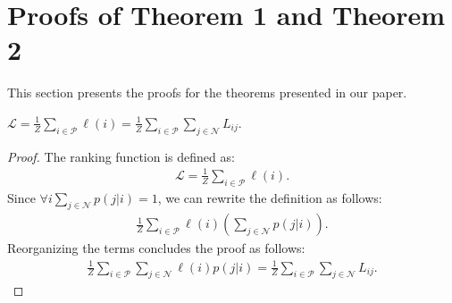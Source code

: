 \documentclass{article}
\newenvironment{customthm}[1]
  {\renewcommand\theinnercustomthm{#1}\innercustomthm}
  {\endinnercustomthm}
\begin{document}
 \section{Proofs of Theorem 1 and Theorem 2}
\label{sec:Proofs}
This section presents the proofs for the theorems presented in our paper.

\begin{customthm}{1}
$\mathcal{L}= \frac{1}{Z}\sum \limits_{i \in \mathcal{P} } \ell(i) =
\frac{1}{Z}\sum \limits_{i \in \mathcal{P} }\sum \limits_{j \in \mathcal{N} }  L_{ij}$.
\end{customthm}
\begin{proof}
The ranking function is defined as:
\begin{align}
    \label{eq:RankingDefinition}
    \mathcal{L}=\frac{1}{Z}\sum_{i \in \mathcal{P}} \ell(i).
\end{align}
Since $\forall i \sum \limits_{j \in \mathcal{N}} p(j|i) = 1$, we can rewrite the definition as follows:
\begin{align}
    \frac{1}{Z} \sum \limits_{i \in \mathcal{P}} \ell(i) \left( \sum \limits_{j \in  \mathcal{N} } p(j|i)\right).
\end{align}
Reorganizing the terms concludes the proof as follows:
\begin{align}
    \frac{1}{Z} \sum \limits_{i \in \mathcal{P} }\sum \limits_{j \in \mathcal{N} } \ell(i)  p(j|i)    
    = \frac{1}{Z} \sum \limits_{i \in \mathcal{P} }\sum \limits_{j \in \mathcal{N} } L_{ij} .
\end{align}
\end{proof}
\end{document}
